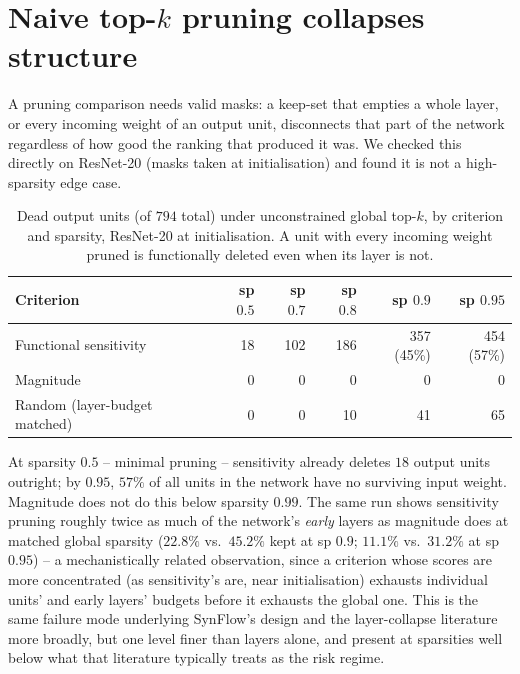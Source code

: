 \documentclass{article}
\begin{document}
\section{Naive top-$k$ pruning collapses structure}
\label{sec:collapse}

A pruning comparison needs valid masks: a keep-set that empties a whole layer, or every
incoming weight of an output unit, disconnects that part of the network regardless of how
good the ranking that produced it was. We checked this directly on ResNet-20 (masks taken
at initialisation) and found it is not a high-sparsity edge case.

\begin{table}[h]
  \caption{Dead output units (of $794$ total) under unconstrained global top-$k$, by
  criterion and sparsity, ResNet-20 at initialisation. A unit with every incoming weight
  pruned is functionally deleted even when its layer is not.}
  \label{tab:collapse}
  \centering
  \small
  \begin{tabular}{lrrrrr}
    \toprule
    Criterion & sp $0.5$ & sp $0.7$ & sp $0.8$ & sp $0.9$ & sp $0.95$ \\
    \midrule
    Functional sensitivity & 18 & 102 & 186 & 357 (45\%) & 454 (57\%) \\
    Magnitude               & 0  & 0   & 0   & 0          & 0 \\
    Random (layer-budget matched) & 0 & 0 & 10 & 41 & 65 \\
    \bottomrule
  \end{tabular}
\end{table}

At sparsity $0.5$ -- minimal pruning -- sensitivity already deletes $18$ output units
outright; by $0.95$, $57\%$ of all units in the network have no surviving input weight.
Magnitude does not do this below sparsity $0.99$. The same run shows sensitivity pruning
roughly twice as much of the network's \emph{early} layers as magnitude does at matched
global sparsity ($22.8\%$ vs.\ $45.2\%$ kept at sp $0.9$; $11.1\%$ vs.\ $31.2\%$ at sp
$0.95$) -- a mechanistically related observation, since a criterion whose scores are more
concentrated (as sensitivity's are, near initialisation) exhausts individual units' and
early layers' budgets before it exhausts the global one. This is the same failure mode
underlying SynFlow's design \citep{tanaka2020synflow} and the layer-collapse literature
more broadly, but one level finer than layers alone, and present at sparsities well below
what that literature typically treats as the risk regime.
\end{document}
